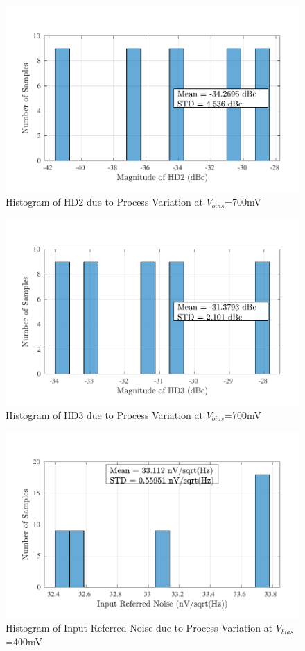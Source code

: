 \begin{figure} [H]
\centering
\includegraphics[scale=1]{Figures/Corners/Overall/Proc_Max/PDFs/Proc_Max_hd2.pdf}
\caption{Histogram of HD2 due to Process Variation at $V_{bias}$=700mV}
\end{figure}

\begin{figure} [H]
\centering
\includegraphics[scale=1]{Figures/Corners/Overall/Proc_Max/PDFs/Proc_Max_hd3.pdf}
\caption{Histogram of HD3 due to Process Variation at $V_{bias}$=700mV}
\end{figure}

\begin{figure} [H]
\centering
\includegraphics[scale=1]{Figures/Corners/Overall/Proc_Max/PDFs/Proc_Max_irn.pdf}
\caption{Histogram of Input Referred Noise due to Process Variation at $V_{bias}$=400mV}
\end{figure}

